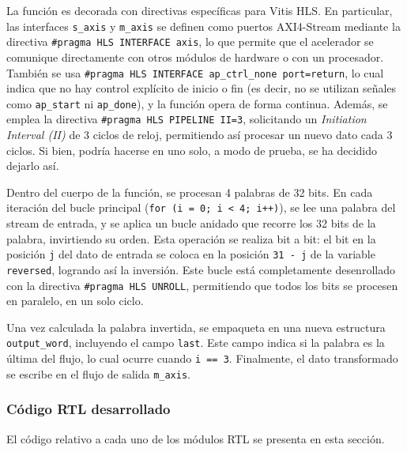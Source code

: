 La función es decorada con directivas específicas para Vitis HLS. En particular, las interfaces \texttt{s\_axis} y \texttt{m\_axis} se definen como puertos AXI4-Stream mediante la directiva \texttt{\#pragma HLS INTERFACE axis}, lo que permite que el acelerador se comunique directamente con otros módulos de hardware o con un procesador. También se usa \texttt{\#pragma HLS INTERFACE ap\_ctrl\_none port=return}, lo cual indica que no hay control explícito de inicio o fin (es decir, no se utilizan señales como \texttt{ap\_start} ni \texttt{ap\_done}), y la función opera de forma continua. Además, se emplea la directiva \texttt{\#pragma HLS PIPELINE II=3}, solicitando un \emph{Initiation Interval (II)} de 3 ciclos de reloj, permitiendo así procesar un nuevo dato cada 3 ciclos. Si bien, podría hacerse en uno solo, a modo de prueba, se ha decidido dejarlo así.

Dentro del cuerpo de la función, se procesan 4 palabras de 32 bits. En cada iteración del bucle principal (\texttt{for (i = 0; i < 4; i++)}), se lee una palabra del stream de entrada, y se aplica un bucle anidado que recorre los 32 bits de la palabra, invirtiendo su orden. Esta operación se realiza bit a bit: el bit en la posición \texttt{j} del dato de entrada se coloca en la posición \texttt{31 - j} de la variable \texttt{reversed}, logrando así la inversión. Este bucle está completamente desenrollado con la directiva \texttt{\#pragma HLS UNROLL}, permitiendo que todos los bits se procesen en paralelo, en un solo ciclo.

Una vez calculada la palabra invertida, se empaqueta en una nueva estructura \texttt{output\_word}, incluyendo el campo \texttt{last}. Este campo indica si la palabra es la última del flujo, lo cual ocurre cuando \texttt{i == 3}. Finalmente, el dato transformado se escribe en el flujo de salida \texttt{m\_axis}.

\subsubsection{Código RTL desarrollado}
El código relativo a cada uno de los módulos RTL se presenta en esta sección.

